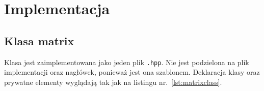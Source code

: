 	\newpage
\section{Implementacja}		%

\subsection{Klasa matrix} \label{sec:MergeSorter}

Klasa jest zaimplementowana jako jeden plik \texttt{.hpp}. Nie jest podzielona na plik implementacji oraz nagłówek, ponieważ jest ona szablonem. Deklaracja klasy oraz prywatne elementy wyglądają tak jak na listingu nr.~\ref{lst:matrixclass}.

